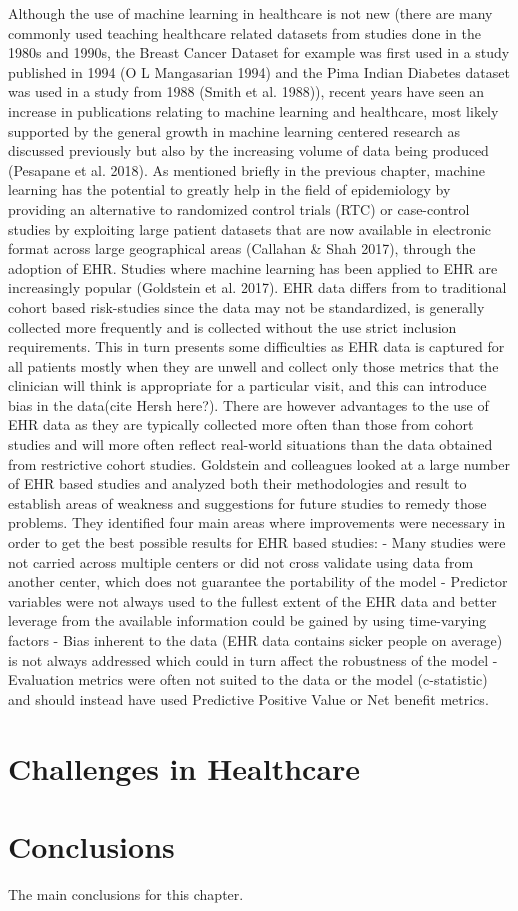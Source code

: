 Although the use of machine learning in healthcare is not new (there are many commonly used teaching healthcare related datasets from studies done in the 1980s and 1990s, the Breast Cancer Dataset for example was first used in a study published in 1994 (O L Mangasarian 1994) and the Pima Indian Diabetes dataset was used in a study from 1988 (Smith et al. 1988)), recent years have seen an increase in publications relating to machine learning and healthcare, most likely supported by the general growth in machine learning centered research as discussed previously but also by the increasing volume of data being produced (Pesapane et al. 2018).
As mentioned briefly in the previous chapter, machine learning has the potential to greatly help in the field of epidemiology by providing an alternative to randomized control trials (RTC) or case-control studies by exploiting large patient datasets that are now available in electronic format across large geographical areas (Callahan & Shah 2017), through the adoption of EHR. Studies where machine learning has been applied to EHR are increasingly popular (Goldstein et al. 2017). EHR data differs from to traditional cohort based risk-studies since the data may not be standardized, is generally collected more frequently and is collected without the use strict inclusion requirements. This in turn presents some difficulties as EHR data is captured for all patients mostly when they are unwell and collect only those metrics that the clinician will think is appropriate for a particular visit, and this can introduce bias in the data(cite Hersh here?). There are however advantages to the use of EHR data as they are typically collected more often than those from cohort studies and will more often reflect real-world situations than the data obtained from restrictive cohort studies. Goldstein and colleagues looked at a large number of EHR based studies and analyzed both their methodologies and result to  establish areas of weakness and suggestions for future studies to remedy those problems. They identified four main areas where improvements were necessary in order to get the best possible results for EHR based studies: 
-	Many studies were not carried across multiple centers or did not cross validate using data from another center, which does not guarantee the portability of the model 
-	Predictor variables were not always used to the fullest extent of the EHR data and better leverage from the available information could be gained by using time-varying factors
-	Bias inherent to the data (EHR data contains sicker people on average) is not always addressed which could in turn affect the robustness of the model
-	Evaluation metrics were often not suited to the data or the model (c-statistic) and should instead have used Predictive Positive Value or Net benefit metrics.


\section{Challenges in Healthcare}



\section{Conclusions}

The main conclusions for this chapter.


